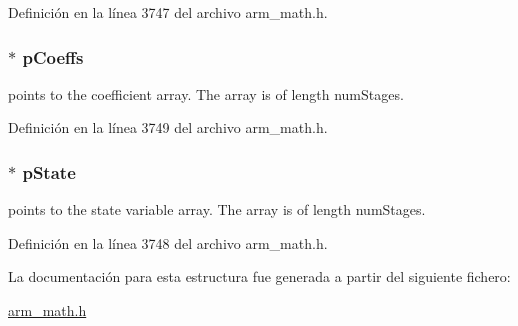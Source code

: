 Definición en la línea 3747 del archivo arm\+\_\+math.\+h.

\subsubsection[{\texorpdfstring{p\+Coeffs}{pCoeffs}}]{$\ast$ p\+Coeffs}\hypertarget{structarm__fir__lattice__instance__q31_a68888e36167d81cb7836db10367a1682}{}\label{structarm__fir__lattice__instance__q31_a68888e36167d81cb7836db10367a1682}
points to the coefficient array. The array is of length num\+Stages. 

Definición en la línea 3749 del archivo arm\+\_\+math.\+h.

\subsubsection[{\texorpdfstring{p\+State}{pState}}]{$\ast$ p\+State}\hypertarget{structarm__fir__lattice__instance__q31_adee4ba3ee8869865af7d8fa08ca913d6}{}\label{structarm__fir__lattice__instance__q31_adee4ba3ee8869865af7d8fa08ca913d6}
points to the state variable array. The array is of length num\+Stages. 

Definición en la línea 3748 del archivo arm\+\_\+math.\+h.



La documentación para esta estructura fue generada a partir del siguiente fichero\+:\begin{DoxyCompactItemize}
\item 
\hyperlink{arm__math_8h}{arm\+\_\+math.\+h}\end{DoxyCompactItemize}
